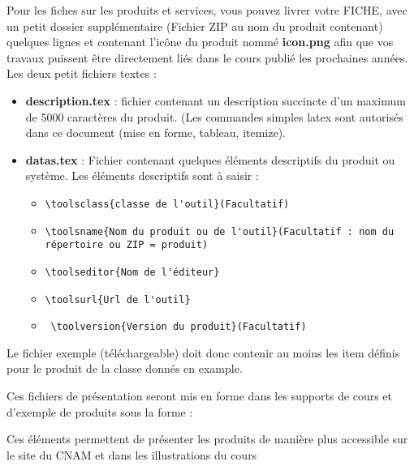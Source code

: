 Pour les fiches sur les produits et services,  vous pouvez livrer votre FICHE, avec un petit dossier  supplémentaire (Fichier ZIP au nom du produit contenant)  quelques lignes et contenant l'icône du produit nommé \textbf{icon.png} afin que vos travaux puissent être directement liés dans le cours publié les prochaines années. Les deux petit fichiers textes  :

\begin{itemize}

  \item  \textbf{description.tex } : fichier contenant un description succincte d'un maximum de 5000 caractères  du produit. (Les commandes simples latex sont autorisés dans ce document (mise en forme, tableau, itemize).
  \item  \textbf{datas.tex} : Fichier contenant quelques éléments descriptifs du produit ou système. Les éléments descriptifs sont à saisir :
\begin{itemize}
 \item \verb|\toolsclass{classe de l'outil}(Facultatif)|
 \item \verb|\toolsname{Nom du produit ou de l'outil}(Facultatif : nom du  répertoire ou ZIP = produit)|
 \item \verb|\toolseditor{Nom de l'éditeur}|
\item \verb|\toolsurl{Url de l'outil}|
\item \ \verb|\toolversion{Version du produit}(Facultatif)|
\end{itemize}
\end{itemize}

Le fichier  exemple (téléchargeable)   doit donc contenir au moins les item définis pour le produit  de la classe  donnés en example. 


Ces fichiers de présentation seront mis en forme dans les supports de cours et d'exemple de produits sous la forme :


Ces éléments permettent de présenter les produits de manière plus accessible sur le site du CNAM et dans les illustrations du cours

